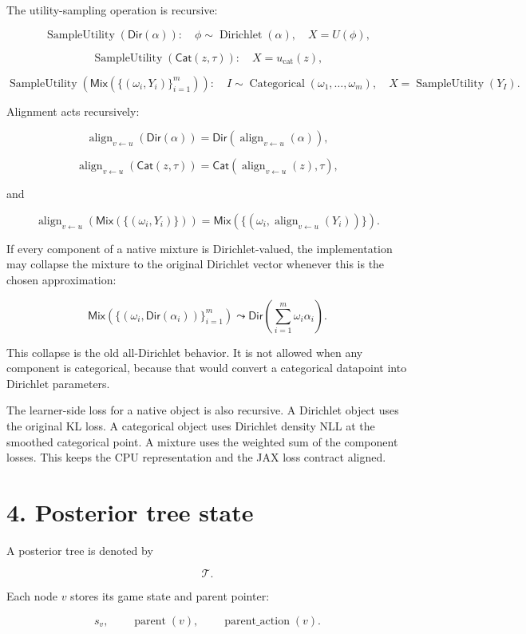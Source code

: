 \documentclass[11pt]{article}
\newcommand{\Dir}{\operatorname{Dirichlet}}
\newcommand{\Cat}{\operatorname{Categorical}}
\newcommand{\Tree}{\mathcal{T}}
\newcommand{\Align}{\operatorname{align}}
\newcommand{\Utility}{U}
\newcommand{\OutcomeUtility}{u_{\mathrm{cat}}}
\newcommand{\DirObj}{\mathsf{Dir}}
\newcommand{\CatObj}{\mathsf{Cat}}
\newcommand{\MixObj}{\mathsf{Mix}}
\newcommand{\SampleUtility}{\operatorname{SampleUtility}}
\begin{document}
The utility-sampling operation is recursive:

\[
\SampleUtility(\DirObj(\alpha)):
\quad
\phi\sim\Dir(\alpha),
\quad
X=\Utility(\phi),
\]

\[
\SampleUtility(\CatObj(z,\tau)):
\quad
X=\OutcomeUtility(z),
\]

\[
\SampleUtility\left(\MixObj(\{(\omega_i,Y_i)\}_{i=1}^m)\right):
\quad
I\sim\Cat(\omega_1,\ldots,\omega_m),
\quad
X=\SampleUtility(Y_I).
\]

Alignment acts recursively:

\[
\Align_{v\leftarrow u}(\DirObj(\alpha))
=
\DirObj(\Align_{v\leftarrow u}(\alpha)),
\]

\[
\Align_{v\leftarrow u}(\CatObj(z,\tau))
=
\CatObj(\Align_{v\leftarrow u}(z),\tau),
\]

and

\[
\Align_{v\leftarrow u}\left(\MixObj(\{(\omega_i,Y_i)\})\right)
=
\MixObj(\{(\omega_i,\Align_{v\leftarrow u}(Y_i))\}).
\]

If every component of a native mixture is Dirichlet-valued, the implementation
may collapse the mixture to the original Dirichlet vector whenever this is the
chosen approximation:

\[
\MixObj\left(\{(\omega_i,\DirObj(\alpha_i))\}_{i=1}^m\right)
\leadsto
\DirObj\left(\sum_{i=1}^m \omega_i\alpha_i\right).
\]

This collapse is the old all-Dirichlet behavior. It is not allowed when any
component is categorical, because that would convert a categorical datapoint into
Dirichlet parameters.

The learner-side loss for a native object is also recursive. A Dirichlet object
uses the original KL loss. A categorical object uses Dirichlet density NLL at the
smoothed categorical point. A mixture uses the weighted sum of the component
losses. This keeps the CPU representation and the JAX loss contract aligned.

\section*{4. Posterior tree state}

A posterior tree is denoted by

\[
\Tree.
\]

Each node \(v\) stores its game state and parent pointer:

\[
s_v,
\qquad
\operatorname{parent}(v),
\qquad
\operatorname{parent\_action}(v).
\]
\end{document}
